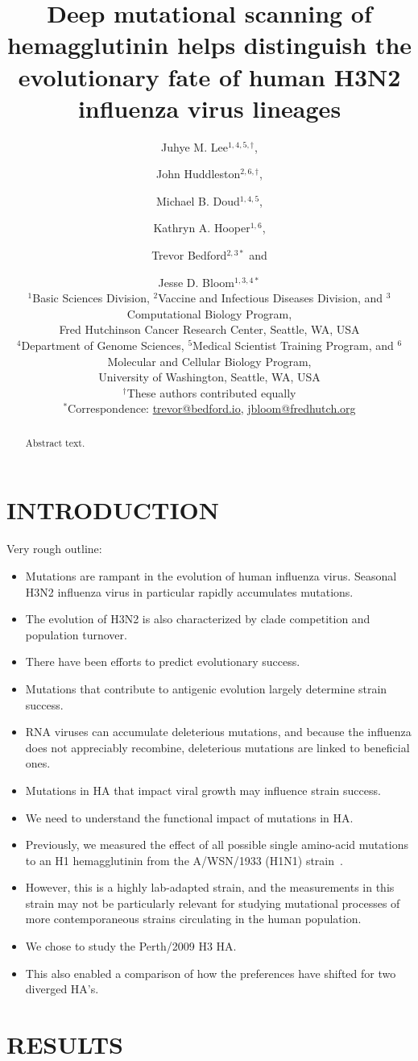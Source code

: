 \documentclass[11pt]{article}
\title{Deep mutational scanning of hemagglutinin helps distinguish the evolutionary fate of human H3N2 influenza virus lineages}
\author{
Juhye M. Lee$^{1,4,5,\dagger}$, \and 
John Huddleston$^{2,6,\dagger}$, \and 
Michael B. Doud$^{1,4,5}$, \and 
Kathryn A. Hooper$^{1,6}$, \and
Trevor Bedford$^{2,3*}$ and \and 
Jesse D. Bloom$^{1,3,4*}$
\\
\scriptsize{$^1$Basic Sciences Division, $^2$Vaccine and Infectious Diseases Division, and $^3$Computational Biology Program,} \\
\scriptsize{Fred Hutchinson Cancer Research Center, Seattle, WA, USA} \\
\scriptsize{$^4$Department of Genome Sciences, $^5$Medical Scientist Training Program, and $^6$Molecular and Cellular Biology Program,} \\
\scriptsize{University of Washington, Seattle, WA, USA} \\
\scriptsize{$^{\dagger}$These authors contributed equally} \\
\scriptsize{$^*$Correspondence: \href{trevor@bedford.io}{trevor@bedford.io}, \href{jbloom@fredhutch.org}{jbloom@fredhutch.org}}
}
\date{}
\begin{document}
\maketitle
\onehalfspacing

\begin{abstract}
Abstract text.
\end{abstract}

\section*{INTRODUCTION}
Very rough outline:
\begin{itemize}
\item Mutations are rampant in the evolution of human influenza virus. Seasonal H3N2 influenza virus in particular rapidly accumulates mutations.
\item The evolution of H3N2 is also characterized by clade competition and population turnover.
\item There have been efforts to predict evolutionary success.
\item Mutations that contribute to antigenic evolution largely determine strain success.
\item RNA viruses can accumulate deleterious mutations, and because the influenza does not appreciably recombine, deleterious mutations are linked to beneficial ones.
\item Mutations in HA that impact viral growth may influence strain success.
\item We need to understand the functional impact of mutations in HA.
\item Previously, we measured the effect of all possible single amino-acid mutations to an H1 hemagglutinin from the A/WSN/1933 (H1N1) strain~\citep{thyagarajan2014inherent,doud2016accurate}. 
\item However, this is a highly lab-adapted strain, and the measurements in this strain may not be particularly relevant for studying mutational processes of more contemporaneous strains circulating in the human population.
\item We chose to study the Perth/2009 H3 HA.
\item This also enabled a comparison of how the preferences have shifted for two diverged HA's.
\end{itemize}

\section*{RESULTS}
\label{sec:results}
\end{document}
